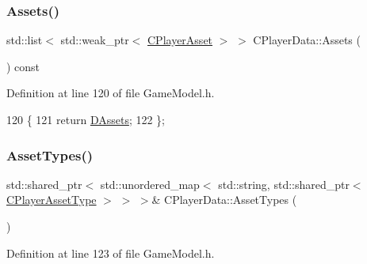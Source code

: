 \subsubsection{\texorpdfstring{Assets()}{Assets()}}
{\footnotesize\ttfamily std\+::list$<$ std\+::weak\+\_\+ptr$<$ \hyperlink{classCPlayerAsset}{C\+Player\+Asset} $>$ $>$ C\+Player\+Data\+::\+Assets (\begin{DoxyParamCaption}{ }\end{DoxyParamCaption}) const\hspace{0.3cm}{\ttfamily [inline]}}



Definition at line 120 of file Game\+Model.\+h.


\begin{DoxyCode}
120                                                              \{
121             \textcolor{keywordflow}{return} \hyperlink{classCPlayerData_a1d7dd355facf52db6242e3554373906c}{DAssets};  
122         \};
\end{DoxyCode}
\hypertarget{classCPlayerData_adbe01c300ec2d40267ca84c7529b9045}{}\label{classCPlayerData_adbe01c300ec2d40267ca84c7529b9045} 
\subsubsection{\texorpdfstring{Asset\+Types()}{AssetTypes()}}
{\footnotesize\ttfamily std\+::shared\+\_\+ptr$<$ std\+::unordered\+\_\+map$<$ std\+::string, std\+::shared\+\_\+ptr$<$ \hyperlink{classCPlayerAssetType}{C\+Player\+Asset\+Type} $>$ $>$ $>$\& C\+Player\+Data\+::\+Asset\+Types (\begin{DoxyParamCaption}{ }\end{DoxyParamCaption})\hspace{0.3cm}{\ttfamily [inline]}}



Definition at line 123 of file Game\+Model.\+h.


